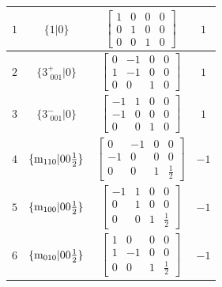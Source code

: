 \documentclass[fleqn,8pt]{jsarticle}
\begin{document}
\begin{longtable}{cccc}
$ 1 $ & $ \{1|0\} $ & $ \begin{bmatrix} 1 & 0 & 0 & 0 \\ 0 & 1 & 0 & 0 \\ 0 & 0 & 1 & 0 \end{bmatrix} $ & $ 1 $ \\ \hline
$ 2 $ & $ \{3^{+}_{\,\,001}|0\} $ & $ \begin{bmatrix} 0 & -1 & 0 & 0 \\ 1 & -1 & 0 & 0 \\ 0 & 0 & 1 & 0 \end{bmatrix} $ & $ 1 $ \\ \hline
$ 3 $ & $ \{3^{-}_{\,\,001}|0\} $ & $ \begin{bmatrix} -1 & 1 & 0 & 0 \\ -1 & 0 & 0 & 0 \\ 0 & 0 & 1 & 0 \end{bmatrix} $ & $ 1 $ \\ \hline
$ 4 $ & $ \{{\rm m}_{110}|0 0 \frac{1}{2}\} $ & $ \begin{bmatrix} 0 & -1 & 0 & 0 \\ -1 & 0 & 0 & 0 \\ 0 & 0 & 1 & \frac{1}{2} \end{bmatrix} $ & $ -1 $ \\ \hline
$ 5 $ & $ \{{\rm m}_{100}|0 0 \frac{1}{2}\} $ & $ \begin{bmatrix} -1 & 1 & 0 & 0 \\ 0 & 1 & 0 & 0 \\ 0 & 0 & 1 & \frac{1}{2} \end{bmatrix} $ & $ -1 $ \\ \hline
$ 6 $ & $ \{{\rm m}_{010}|0 0 \frac{1}{2}\} $ & $ \begin{bmatrix} 1 & 0 & 0 & 0 \\ 1 & -1 & 0 & 0 \\ 0 & 0 & 1 & \frac{1}{2} \end{bmatrix} $ & $ -1 $ \\
\end{longtable}
\end{document}
